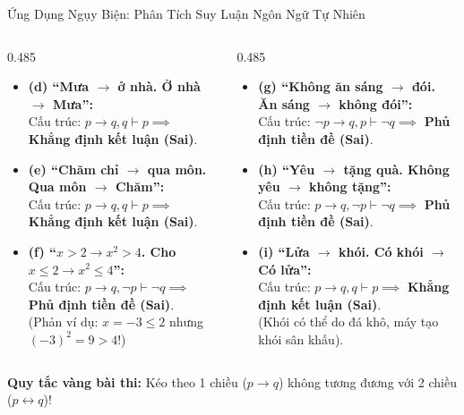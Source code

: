 \documentclass[aspectratio=169, 10pt]{beamer}
\begin{document}
\begin{frame}{Ứng Dụng Ngụy Biện: Phân Tích Suy Luận Ngôn Ngữ Tự Nhiên}
  \begin{cozyExample}
    \footnotesize
    \begin{columns}[t, onlytextwidth]
      \begin{column}{0.485\textwidth}
        \begin{itemize}
          \setlength{\itemsep}{2pt}
          \item \textbf{(d) ``Mưa $\to$ ở nhà. Ở nhà $\to$ Mưa'':}\\
          Cấu trúc: $p \to q, q \vdash p \implies$ \textbf{\textcolor{cozyFalse}{Khẳng định kết luận (Sai)}}.
          \item \textbf{(e) ``Chăm chỉ $\to$ qua môn. Qua môn $\to$ Chăm'':}\\
          Cấu trúc: $p \to q, q \vdash p \implies$ \textbf{\textcolor{cozyFalse}{Khẳng định kết luận (Sai)}}.
          \item \textbf{(f) ``$x > 2 \to x^2 > 4$. Cho $x \le 2 \to x^2 \le 4$'':}\\
          Cấu trúc: $p \to q, \neg p \vdash \neg q \implies$ \textbf{\textcolor{cozyFalse}{Phủ định tiền đề (Sai)}}.\\
          \scriptsize\textcolor{cozyMuted}{(Phản ví dụ: $x = -3 \le 2$ nhưng $(-3)^2 = 9 > 4$!)}
        \end{itemize}
      \end{column}
      \begin{column}{0.485\textwidth}
        \begin{itemize}
          \setlength{\itemsep}{2pt}
          \item \textbf{(g) ``Không ăn sáng $\to$ đói. Ăn sáng $\to$ không đói'':}\\
          Cấu trúc: $\neg p \to q, p \vdash \neg q \implies$ \textbf{\textcolor{cozyFalse}{Phủ định tiền đề (Sai)}}.
          \item \textbf{(h) ``Yêu $\to$ tặng quà. Không yêu $\to$ không tặng'':}\\
          Cấu trúc: $p \to q, \neg p \vdash \neg q \implies$ \textbf{\textcolor{cozyFalse}{Phủ định tiền đề (Sai)}}.
          \item \textbf{(i) ``Lửa $\to$ khói. Có khói $\to$ Có lửa'':}\\
          Cấu trúc: $p \to q, q \vdash p \implies$ \textbf{\textcolor{cozyFalse}{Khẳng định kết luận (Sai)}}.\\
          \scriptsize\textcolor{cozyMuted}{(Khói có thể do đá khô, máy tạo khói sân khấu).}
        \end{itemize}
      \end{column}
    \end{columns}
  \end{cozyExample}
  \vspace{0.03cm}
  \par\centering\footnotesize\color{cozyWarm}\textbf{Quy tắc vàng bài thi:} Kéo theo 1 chiều ($p \to q$) không tương đương với 2 chiều ($p \leftrightarrow q$)!
\end{frame}
\end{document}
